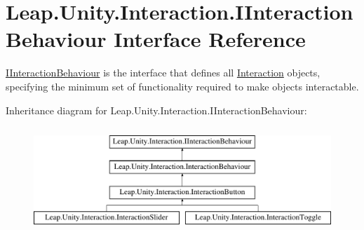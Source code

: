 \hypertarget{interface_leap_1_1_unity_1_1_interaction_1_1_i_interaction_behaviour}{}\section{Leap.\+Unity.\+Interaction.\+I\+Interaction\+Behaviour Interface Reference}
\label{interface_leap_1_1_unity_1_1_interaction_1_1_i_interaction_behaviour}


\mbox{\hyperlink{interface_leap_1_1_unity_1_1_interaction_1_1_i_interaction_behaviour}{I\+Interaction\+Behaviour}} is the interface that defines all \mbox{\hyperlink{namespace_leap_1_1_unity_1_1_interaction}{Interaction}} objects, specifying the minimum set of functionality required to make objects interactable.  


Inheritance diagram for Leap.\+Unity.\+Interaction.\+I\+Interaction\+Behaviour\+:\begin{figure}[H]
\begin{center}
\leavevmode
\includegraphics[height=4.000000cm]{interface_leap_1_1_unity_1_1_interaction_1_1_i_interaction_behaviour}
\end{center}
\end{figure}
